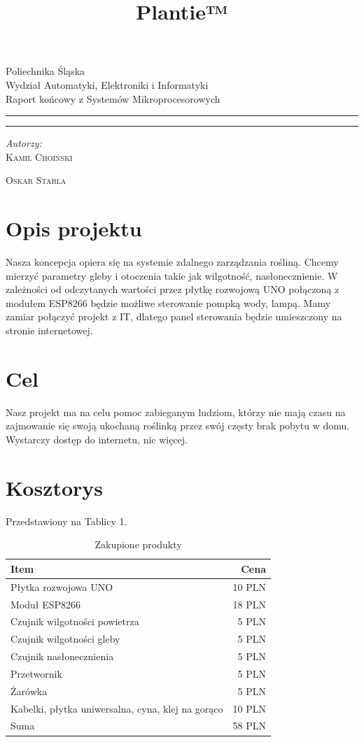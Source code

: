 \documentclass[12pt]{article}
\title{Plantie™}
\makeatletter
\newcommand{\linia}{\rule{\linewidth}{0.4mm}}
\renewcommand{\maketitle}{\begin{titlepage}
		\vspace*{1cm}
		\begin{center}\small
			Poliechnika Śląska\\
			Wydział Automatyki, Elektroniki i Informatyki\\
			Raport końcowy z Systemów Mikroprocesorowych
		\end{center}
		\vspace{3cm}
		\noindent\linia
		\begin{center}
			\LARGE \textsc{\@title}
		\end{center}
		\linia
		\vspace{0.5cm}
		\begin{flushright}
			\begin{minipage}{15cm}
				\textit{\small Autorzy:}\\
				\normalsize \textsc{Kamil Choiński} \par \textsc{Oskar Stabla} \par
			\end{minipage}
		
			
		\end{flushright}
		\vspace*{\stretch{6}}
		\begin{center}
			\@date
		\end{center}
	\end{titlepage}%
}
\makeatother
\begin{document}
\maketitle

\tableofcontents





\section{Opis projektu}
Nasza koncepcja opiera się na systemie zdalnego zarządzania rośliną. Chcemy mierzyć parametry
gleby i otoczenia takie jak wilgotność, nasłonecznienie. W zależności od odczytanych wartości przez
płytkę rozwojową UNO połączoną z modułem ESP8266 będzie możliwe sterowanie pompką wody,
lampą. Mamy zamiar połączyć projekt z IT, dlatego panel sterowania będzie umieszczony na stronie
internetowej.

\section{Cel}
Nasz projekt ma na celu pomoc zabieganym ludziom, którzy nie mają czasu na zajmowanie się
swoją ukochaną roślinką przez swój częsty brak pobytu w domu. Wystarczy dostęp do internetu,
nic więcej.

\section{Kosztorys}
Przedstawiony na Tablicy 1.
\begin{table}
\centering
\begin{tabular}{l|r}
Item & Cena \\\hline
Płytka rozwojowa UNO & 10 PLN \\
Moduł ESP8266 & 18 PLN \\

Czujnik wilgotności powietrza & 5 PLN \\

Czujnik wilgotności gleby & 5 PLN \\

Czujnik nasłonecznienia & 5 PLN \\

Przetwornik & 5 PLN \\

Żarówka & 5 PLN \\

Kabelki, płytka uniwersalna, cyna, klej na gorąco & 10 PLN 
\\ \hline
Suma & 58 PLN

\end{tabular}
\caption{\label{tab:widgets}Zakupione produkty}
\end{table}
\end{document}
